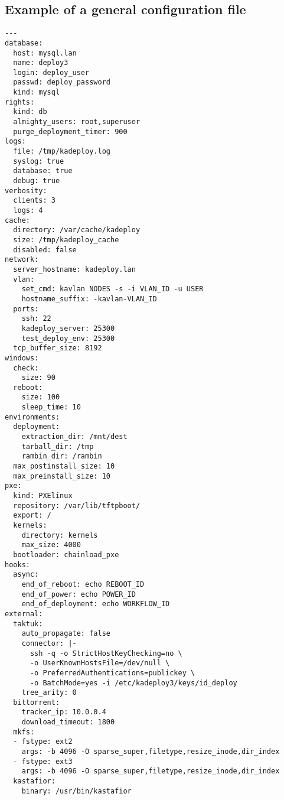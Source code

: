 \documentclass[a4wide,10pt,oneside]{book}
\begin{document}
\subsection{Example of a general configuration file}
\begin{small}
\begin{verbatim}
--- 
database:
  host: mysql.lan
  name: deploy3
  login: deploy_user
  passwd: deploy_password
  kind: mysql
rights:
  kind: db
  almighty_users: root,superuser
  purge_deployment_timer: 900
logs:
  file: /tmp/kadeploy.log
  syslog: true
  database: true
  debug: true
verbosity:
  clients: 3
  logs: 4
cache:
  directory: /var/cache/kadeploy
  size: /tmp/kadeploy_cache
  disabled: false
network:
  server_hostname: kadeploy.lan
  vlan:
    set_cmd: kavlan NODES -s -i VLAN_ID -u USER
    hostname_suffix: -kavlan-VLAN_ID
  ports: 
    ssh: 22
    kadeploy_server: 25300
    test_deploy_env: 25300
  tcp_buffer_size: 8192
windows: 
  check: 
    size: 90
  reboot: 
    size: 100
    sleep_time: 10
environments: 
  deployment: 
    extraction_dir: /mnt/dest
    tarball_dir: /tmp
    rambin_dir: /rambin
  max_postinstall_size: 10
  max_preinstall_size: 10
pxe:
  kind: PXElinux
  repository: /var/lib/tftpboot/
  export: /
  kernels:
    directory: kernels
    max_size: 4000
  bootloader: chainload_pxe
hooks: 
  async: 
    end_of_reboot: echo REBOOT_ID
    end_of_power: echo POWER_ID
    end_of_deployment: echo WORKFLOW_ID
external:
  taktuk: 
    auto_propagate: false
    connector: |-
      ssh -q -o StrictHostKeyChecking=no \
      -o UserKnownHostsFile=/dev/null \
      -o PreferredAuthentications=publickey \
      -o BatchMode=yes -i /etc/kadeploy3/keys/id_deploy
    tree_arity: 0
  bittorrent: 
    tracker_ip: 10.0.0.4
    download_timeout: 1800
  mkfs:
  - fstype: ext2
    args: -b 4096 -O sparse_super,filetype,resize_inode,dir_index
  - fstype: ext3
    args: -b 4096 -O sparse_super,filetype,resize_inode,dir_index
  kastafior:
    binary: /usr/bin/kastafior
\end{verbatim}
\end{small}
\end{document}
